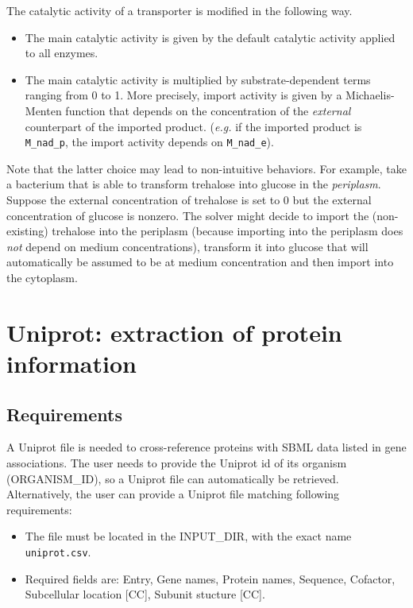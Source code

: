 The catalytic activity of a transporter is modified in the following way.
\begin{itemize}
\item The main catalytic activity is given by the default catalytic activity applied to all enzymes.
\item The main catalytic activity is multiplied by substrate-dependent terms ranging from 0 to 1.
More precisely, import activity is given by a Michaelis-Menten
function that depends on the concentration of the \emph{external} counterpart of the imported product.
(\textit{e.g.} if the imported product is \texttt{M\_nad\_p},
the import activity depends on \texttt{M\_nad\_e}).
\end{itemize}

Note that the latter choice may lead to non-intuitive behaviors.
For example, take a bacterium that is able to transform trehalose into glucose in the \emph{periplasm}.
Suppose the external concentration of trehalose is set to 0
but the external concentration of glucose is nonzero.
The solver might decide to import the (non-existing) trehalose into the periplasm
(because importing into the periplasm does \emph{not} depend on medium concentrations),
transform it into glucose that will automatically be assumed to be at medium concentration
and then import into the cytoplasm.

\section{Uniprot: extraction of protein information}

\subsection{Requirements}

A Uniprot file is needed to cross-reference proteins with SBML data listed in gene associations.
The user needs to provide the Uniprot id of its organism (ORGANISM\_ID),
so a Uniprot file can automatically be retrieved.
Alternatively, the user can provide a Uniprot file matching following requirements:
\begin{itemize}
  \item The file must be located in the INPUT\_DIR, with the exact name \texttt{uniprot.csv}.
\item Required fields are:
Entry, Gene names, Protein names, Sequence, Cofactor, Subcellular location [CC], Subunit stucture [CC].
\end{itemize}

